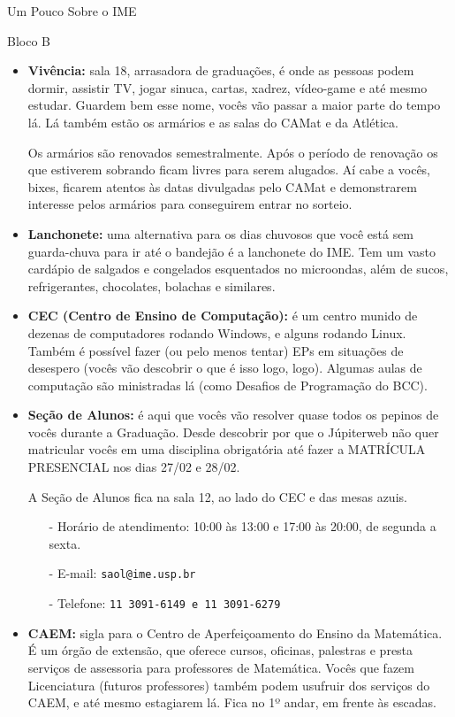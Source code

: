\begin{secao}{Um Pouco Sobre o IME}
\begin{subsecao}{Bloco B}
\begin{itemize}
\item {\bf Vivência:} sala 18, arrasadora de graduações, é onde as pessoas podem
dormir, assistir TV, jogar sinuca, cartas, xadrez, vídeo-game e até
mesmo estudar. Guardem bem esse nome, vocês vão passar a maior parte do tempo lá.
Lá também estão os armários e as salas do CAMat e da Atlética.

Os armários são renovados semestralmente. Após o período de renovação os que
estiverem sobrando ficam livres para serem alugados. Aí cabe a vocês, bixes, ficarem
atentos às datas divulgadas pelo CAMat e demonstrarem interesse pelos armários para
conseguirem entrar no sorteio.

\item {\bf Lanchonete:} uma alternativa para os dias chuvosos que você está sem
  guarda-chuva para ir até o bandejão é a lanchonete do IME. Tem um vasto
  cardápio de salgados e congelados esquentados no microondas, além de sucos,
  refrigerantes, chocolates, bolachas e similares.

\item {\bf CEC (Centro de Ensino de Computação):} é um centro munido de dezenas
de computadores rodando Windows, e alguns rodando Linux. Também é possível fazer
(ou pelo menos tentar) EPs em situações de desespero (vocês vão descobrir o que é
isso logo, logo). Algumas aulas de computação são ministradas lá (como Desafios
de Programação do BCC).

\item {\bf Seção de Alunos:} é aqui que vocês vão resolver quase todos os
pepinos de vocês durante a Graduação. Desde descobrir por que o Júpiterweb não
quer matricular vocês em uma disciplina obrigatória até fazer a
MATRÍCULA PRESENCIAL nos dias 27/02 e 28/02. %

A Seção de Alunos fica na sala 12, ao lado do CEC e das mesas azuis.
\begin{itemize}
\item[-] Horário de atendimento: 10:00 às 13:00 e 17:00 às 20:00, de segunda a sexta.
\item[-] E-mail: \tt{saol@ime.usp.br}
\item[-] Telefone: \tt{11 3091-6149} e \tt{11 3091-6279}
\end{itemize}

\item {\bf CAEM:} sigla para o Centro de Aperfeiçoamento do Ensino da
  Matemática. É um órgão de extensão, que oferece cursos, oficinas, palestras e
  presta serviços de assessoria para professores de Matemática. Vocês que fazem
  Licenciatura (futuros professores) também podem usufruir dos serviços do CAEM,
  e até mesmo estagiarem lá. Fica no 1º andar, em frente às escadas.


\end{itemize}
\end{subsecao}
\end{secao}
